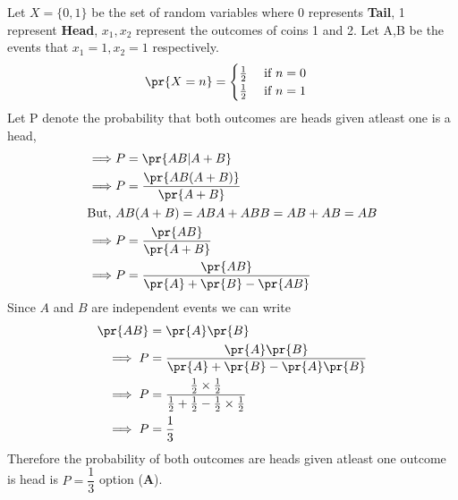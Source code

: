 Let $X=\{0,1\}$ be the set of random variables where 0 represents \textbf{Tail}, 1 represent \textbf{Head}, $x_1,x_2$ represent the outcomes of coins 1 and 2. Let A,B be the events that $x_1=1,x_2=1$ respectively.
\begin{align}
& \pr{X=n}= \begin{cases}
\frac{1}{2} & \text{ if } n=0\\
\frac{1}{2}  & \text{ if } n=1
\end{cases}
\end{align}
Let P denote the probability that both outcomes are heads given atleast one is a head,
\begin{align}
\implies & P=\pr{AB|A+B}\\
\implies & P=\dfrac{\pr{AB(A+B)}}{\pr{A+B}}\\
\text{But, }&AB(A+B)=ABA+ABB=AB+AB=AB\\ 
\implies & P=\dfrac{\pr{AB}}{\pr{A+B}}\\
\implies & P=\dfrac{\pr{AB}}{\pr{A}+\pr{B}-\pr{AB}}
\end{align}
Since $A$ and $B$ are independent events we can write
\begin{align}
 \pr{AB}&=\pr{A}\pr{B}\\
 \implies P&=\dfrac{\pr{A}\pr{B}}{\pr{A}+\pr{B}-\pr{A}\pr{B}}\\
\implies P&= \dfrac{\frac{1}{2}\times \frac{1}{2}}{\frac{1}{2}+\frac{1}{2}-\frac{1}{2}\times \frac{1}{2}}\\
\implies P&=\dfrac{1}{3}
\end{align}
Therefore the probability of both outcomes are heads given atleast one outcome is head is $P=\dfrac{1}{3}$ option (\textbf{A}).